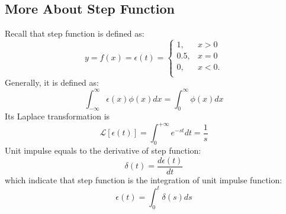 \documentclass[10pt,a4paper,oneside]{article}
\begin{document}
\subsection{More About Step Function}
Recall that step function is defined as:
\[
y = f(x) = \epsilon(t) = \left\{
\begin{array}{ll}
1, & x > 0 \\
0.5, & x = 0\\
0, & x < 0. \\
\end{array}\right.
\]
Generally, it is defined as:
\[
\int_{-\infty}^{\infty} \epsilon(x) \phi(x) dx = \int_{0}^{\infty} \phi(x) dx
\]
Its Laplace transformation is
\[
\mathcal{L}[\epsilon(t)] = \int_{0}^{+\infty}e^{-st} dt = \frac{1}{s}
\]
Unit impulse equals to the derivative of step function:
\[
\delta(t) = \frac{d \epsilon(t)}{dt}
\]
which indicate that step function is the integration of unit impulse function:
\[
\epsilon(t) = \int_{0}^{t}\delta(s)ds
\]
\end{document}
